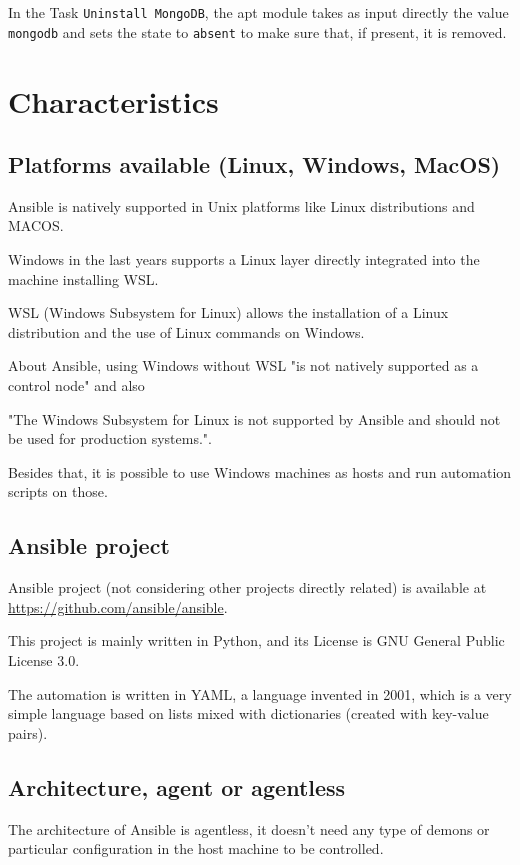 \documentclass[12pt,a4paper,openright,twoside]{book}
\begin{document}
In the Task \texttt{Uninstall MongoDB}, the apt module takes as input directly the value \texttt{mongodb} and sets the state to \texttt{absent} to make sure that, if present, it is removed.

\section{Characteristics}

\subsection{Platforms available (Linux, Windows, MacOS)}
Ansible is natively supported in Unix platforms like Linux distributions and MACOS.


Windows in the last years supports a Linux layer directly integrated into the machine installing WSL.

WSL (Windows Subsystem for Linux) allows the installation of a Linux distribution and the use of Linux commands on Windows.


About Ansible, using Windows without WSL "is not natively supported as a control node"\cite{ansibleDocInstallIntro} and also


"The Windows Subsystem for Linux is not supported by Ansible and should not be used for production systems."\cite{ansibleWinFaq}.


Besides that, it is possible to use Windows machines as hosts and run automation scripts on those.

\subsection{Ansible project}

Ansible project (not considering other projects directly related) is available at \url{https://github.com/ansible/ansible}\cite{ansibleGithub}.


This project is mainly written in Python, and its License is GNU General Public License 3.0.


The automation is written in YAML, a language invented in 2001, which is a very simple language based on lists mixed with dictionaries (created with key-value pairs).

\subsection{Architecture, agent or agentless}


The architecture of Ansible is agentless, it doesn't need any type of demons or particular configuration in the host machine to be controlled.
\end{document}
